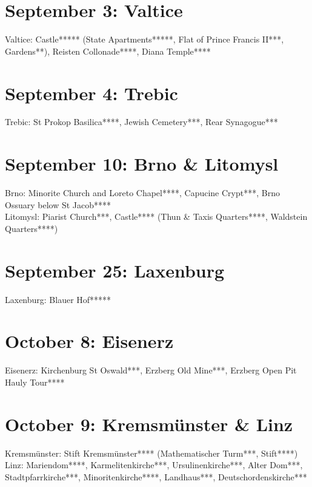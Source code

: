 \section{September 3:  Valtice}
\label{2022:Valtice}

Valtice: Castle***** (State Apartments*****, Flat of Prince Francis II***, Gardens**), Reisten Collonade****, Diana Temple****

\section{September 4:  Trebic}
\label{2022:Trebic}

Trebic: St Prokop Basilica****, Jewish Cemetery***, Rear Synagogue***\\

\section{September 10:  Brno \& Litomysl}
\label{2022:Litomysl}

Brno: Minorite Church and Loreto Chapel****, Capucine Crypt***, Brno Ossuary below St Jacob****\\
Litomysl: Piarist Church***, Castle**** (Thun \& Taxis Quarters****, Waldstein Quarters****)\\

\section{September 25: Laxenburg}
\label{2022:Laxenburg}

Laxenburg: Blauer Hof*****\\

\section{October 8: Eisenerz}
\label{2022:Eisenerz}

Eisenerz: Kirchenburg St Oswald***, Erzberg Old Mine***, Erzberg Open Pit Hauly Tour****\\

\section{October 9: Kremsm\"unster \& Linz}
\label{2022:Kremsmuenster}

Kremsm\"unster: Stift Kremsm\"unster**** (Mathematischer Turm***, Stift****)\\
Linz: Mariendom****, Karmelitenkirche***, Ursulinenkirche***, Alter Dom***, Stadtpfarrkirche***, Minoritenkirche****, Landhaus***, Deutschordenskirche***

